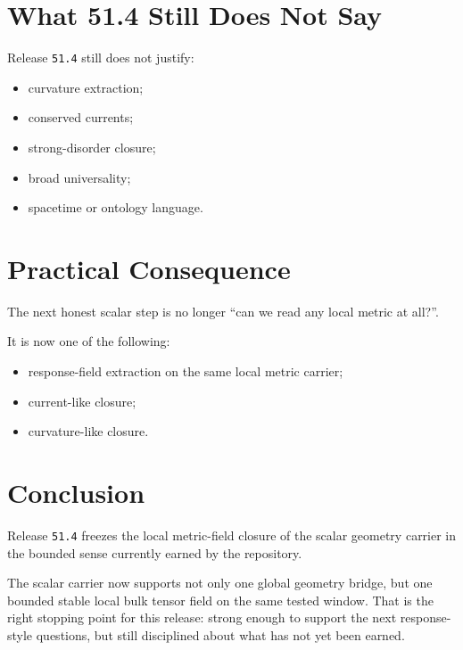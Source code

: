 \documentclass[11pt]{article}
\begin{document}
\section{What 51.4 Still Does Not Say}

Release \texttt{51.4} still does not justify:
\begin{itemize}
\item curvature extraction;
\item conserved currents;
\item strong-disorder closure;
\item broad universality;
\item spacetime or ontology language.
\end{itemize}

\section{Practical Consequence}

The next honest scalar step is no longer ``can we read any local metric at all?''.

It is now one of the following:
\begin{itemize}
\item response-field extraction on the same local metric carrier;
\item current-like closure;
\item curvature-like closure.
\end{itemize}

\section{Conclusion}

Release \texttt{51.4} freezes the local metric-field closure of the scalar geometry carrier in the bounded sense currently earned by the repository.

The scalar carrier now supports not only one global geometry bridge, but one bounded stable local bulk tensor field on the same tested window. That is the right stopping point for this release: strong enough to support the next response-style questions, but still disciplined about what has not yet been earned.
\end{document}
